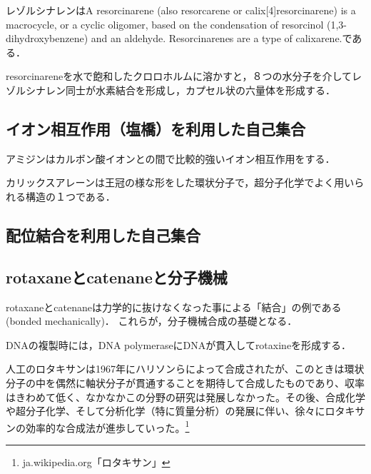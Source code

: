 \documentclass[uplatex, dvipdfmx]{jsreport}
\begin{document}
\begin{definition}[resorcinarene]
    レゾルシナレンはA resorcinarene (also resorcarene or calix[4]resorcinarene) is a macrocycle, or a cyclic oligomer, based on the condensation of resorcinol (1,3-dihydroxybenzene) and an aldehyde. Resorcinarenes are a type of calixarene.である．
\end{definition}
\begin{example}
    resorcinareneを水で飽和したクロロホルムに溶かすと，８つの水分子を介してレゾルシナレン同士が水素結合を形成し，カプセル状の六量体を形成する．
\end{example}

\subsection{イオン相互作用（塩橋）を利用した自己集合}

\begin{definition}
    アミジンはカルボン酸イオンとの間で比較的強いイオン相互作用をする．
\end{definition}
\begin{definition}[calixarene]
    カリックスアレーンは王冠の様な形をした環状分子で，超分子化学でよく用いられる構造の１つである．
\end{definition}

\subsection{配位結合を利用した自己集合}

\subsection{rotaxaneとcatenaneと分子機械}

rotaxaneとcatenaneは力学的に抜けなくなった事による「結合」の例である(bonded mechanically)．
これらが，分子機械合成の基礎となる．

\begin{example}[生命形でのrotaxane]
    DNAの複製時には，DNA polymeraseにDNAが貫入してrotaxineを形成する．
\end{example}
\begin{remark}
    人工のロタキサンは1967年にハリソンらによって合成されたが、このときは環状分子の中を偶然に軸状分子が貫通することを期待して合成したものであり、収率はきわめて低く、なかなかこの分野の研究は発展しなかった。その後、合成化学や超分子化学、そして分析化学（特に質量分析）の発展に伴い、徐々にロタキサンの効率的な合成法が進歩していった。\footnote{ja.wikipedia.org「ロタキサン」}
\end{remark}
\end{document}

